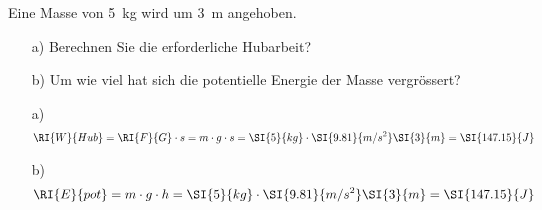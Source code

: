 
\begin{aufgabe}
	Eine Masse von \SI{5}{kg} wird um \SI{3}{m} angehoben.
	\begin{itemize}
		\item [a)] Berechnen Sie die erforderliche Hubarbeit?
		\item [b)] Um wie viel hat sich die potentielle Energie der Masse vergrössert?
	\end{itemize}
	\begin{loesung}
		\begin{itemize}
			\item [a)] 
				\begin{eqnarray*}
					\RI{W}{Hub} = \RI{F}{G}\cdot s=m\cdot g\cdot s= \SI{5}{kg}\cdot\SI{9.81}{m/s^2}\SI{3}{m}=\SI{147.15}{J}
				\end{eqnarray*}
			\item [b)] 
				\begin{eqnarray*}
					\RI{E}{pot} = m\cdot g\cdot h= \SI{5}{kg}\cdot\SI{9.81}{m/s^2}\SI{3}{m}=\SI{147.15}{J}
				\end{eqnarray*}
		\end{itemize}
	\end{loesung}
\end{aufgabe}
